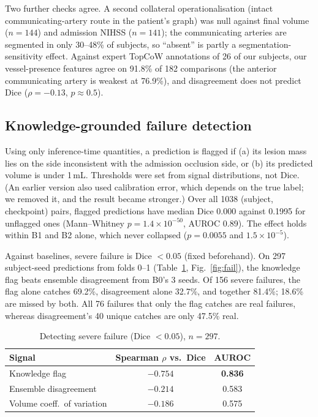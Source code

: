 \documentclass[conference]{IEEEtran}
\begin{document}
Two further checks agree. A second collateral operationalisation (intact communicating-artery route in the patient's graph) was null against final volume ($n=144$) and admission NIHSS ($n=141$); the communicating arteries are segmented in only 30--48\% of subjects, so ``absent'' is partly a segmentation-sensitivity effect. Against expert TopCoW annotations of 26 of our subjects, our vessel-presence features agree on 91.8\% of 182 comparisons (the anterior communicating artery is weakest at 76.9\%), and disagreement does not predict Dice ($\rho=-0.13$, $p\approx0.5$).

\subsection{Knowledge-grounded failure detection}
Using only inference-time quantities, a prediction is flagged if (a) its lesion mass lies on the side inconsistent with the admission occlusion side, or (b) its predicted volume is under 1\,mL. Thresholds were set from signal distributions, not Dice. (An earlier version also used calibration error, which depends on the true label; we removed it, and the result became stronger.) Over all 1038 (subject, checkpoint) pairs, flagged predictions have median Dice 0.000 against 0.1995 for unflagged ones (Mann--Whitney $p=1.4\times10^{-50}$, AUROC 0.89). The effect holds within B1 and B2 alone, which never collapsed ($p=0.0055$ and $1.5\times10^{-5}$).

Against baselines, severe failure is Dice $<0.05$ (fixed beforehand). On 297 subject-seed predictions from folds 0--1 (Table~\ref{tab:fail}, Fig.~\ref{fig:fail}), the knowledge flag beats ensemble disagreement from B0's 3 seeds. Of 156 severe failures, the flag alone catches 69.2\%, disagreement alone 32.7\%, and together 81.4\%; 18.6\% are missed by both. All 76 failures that only the flag catches are real failures, whereas disagreement's 40 unique catches are only 47.5\% real.

\begin{table}[t]
\centering
\caption{Detecting severe failure (Dice $<0.05$), $n=297$.}
\label{tab:fail}
\footnotesize
\begin{tabular}{lcc}
\toprule
\textbf{Signal} & \textbf{Spearman $\rho$ vs.\ Dice} & \textbf{AUROC} \\
\midrule
Knowledge flag & $-0.754$ & \textbf{0.836} \\
Ensemble disagreement & $-0.214$ & 0.583 \\
Volume coeff.\ of variation & $-0.186$ & 0.575 \\
\bottomrule
\end{tabular}
\end{table}
\end{document}
